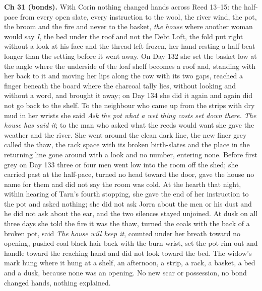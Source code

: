 \documentclass{design/chronicle}
\begin{document}
{\textbf{Ch 31 (bonds).} With Corin nothing changed hands across Reed 13–15: the half-pace from every open slate, every instruction to the wool, the river wind, the pot, the broom and the fire and never to the basket, \emph{the house} where another woman would say \emph{I}, the bed under the roof and not the Debt Loft, the fold put right without a look at his face and the thread left frozen, her hand resting a half-beat longer than the setting before it went away. On Day 132 she set the basket low at the angle where the underside of the loaf shelf becomes a roof and, standing with her back to it and moving her lips along the row with its two gaps, reached a finger beneath the board where the charcoal tally lies, without looking and without a word, and brought it away; on Day 134 she did it again and again did not go back to the shelf. To the neighbour who came up from the strips with dry mud in her wrists she said \emph{Ask the pot what a wet thing costs set down there. The house has said it}; to the man who asked what the reeds would want she gave the weather and the river. She went around the clean dark line, the new finer grey called the thaw, the rack space with its broken birth-slates and the place in the returning line gone around with a look and no number, entering none. Before first grey on Day 133 three or four men went low into the room off the shed; she carried past at the half-pace, turned no head toward the door, gave the house no name for them and did not say the room was cold. At the hearth that night, within hearing of Tarn’s fourth stopping, she gave the end of her instruction to the pot and asked nothing; she did not ask Jorra about the men or his dust and he did not ask about the ear, and the two silences stayed unjoined. At dusk on all three days she told the fire it was the thaw, turned the coals with the back of a broken pot, said \emph{The house will keep it}, counted under her breath toward no opening, pushed coal-black hair back with the burn-wrist, set the pot rim out and handle toward the reaching hand and did not look toward the bed. The widow’s mark hung where it hung at a shelf, an afternoon, a strip, a rack, a basket, a bed and a dusk, because none was an opening. No new scar or possession, no bond changed hands, nothing explained.

}
\end{document}
